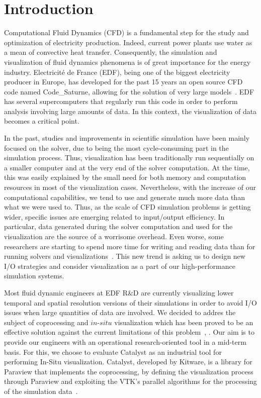 \section{Introduction}
Computational Fluid Dynamics (CFD) is a fundamental step for the study and
optimization of electricity production. Indeed, current power plants use water
as a mean of convective heat transfer.  Consequently, the simulation and
visualization of fluid dynamics phenomena is of great importance for the energy
industry. Electricité de France (EDF), being one of the biggest electricity producer in Europe, has
developed for the past 15 years an open source CFD code named Code\_Saturne,
allowing for the solution of very large models~\cite{5644955}. EDF has
several supercomputers that regularly run this code in order to perform
analysis involving large amounts of data. In this context, the visualization of
data becomes a critical point. 

In the past, studies and improvements in scientific simulation have been mainly
focused on the solver, due to being the most cycle-consuming part in the
simulation process. Thus, visualization has been traditionally run sequentially
on a smaller computer and at the very end of the solver computation. At the
time, this was easily explained by the small need for both memory and
computation resources in most of the visualization cases. Nevertheless, with the
increase of our computational capabilities, we tend to use and generate much
more data than what we were used to. Thus, as the scale of CFD simulation
problems is getting wider, specific issues are emerging related to input/output
efficiency. In particular, data generated during the solver computation and
used for the visualization are the source of a worrisome overhead. Even worse,
some researchers are starting to spend more time for writing and reading data
than for running solvers and visualizations~\cite{1742-6596-125-1-012099}.
This new trend is asking us to design new I/O strategies and consider
visualization as a part of our high-performance simulation systems.


Most fluid dynamic engineers at EDF R\&D are currently visualizing lower temporal and spatial 
resolution versions of their simulations in order to avoid I/O issues when large quantities of data are involved.
We decided to addres the subject of coprocessing and $in$-$situ$
visualization which has been proved to be an effective solution against the current
limitations of this problem~\cite{sandiareport}, \cite{4090186}. Our aim is to provide 
our engineers with an operational research-oriented tool in a mid-term basis.
For this, we choose to evaluate Catalyst as an industrial tool for performing In-Situ visualization. 
Catalyst, developed by Kitware, is a library for Paraview that implements the
coprocessing, by defining the visualization process through Paraview and
exploiting the VTK's parallel algorithms for the processing of the simulation
data~\cite{6092322}. 

